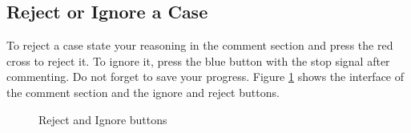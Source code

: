 \documentclass{article}
\begin{document}
\subsection{Reject or Ignore a Case}
\label{reject-ignore-case}
To reject a case state your reasoning in the comment section and press the red cross to reject it. To ignore it, press the blue button with the stop signal after commenting. Do not forget to save your progress. Figure \ref{reject_ignore} shows the interface of the comment section and the ignore and reject buttons. 

\begin{figure}[H]
     \caption{Reject and Ignore buttons}
     \label{reject_ignore}
\end{figure}

\pagebreak
\end{document}

